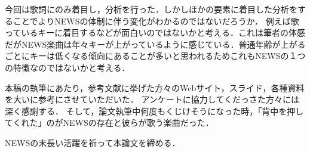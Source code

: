 今回は歌詞にのみ着目し，分析を行った．しかしほかの要素に着目した分析をすることでよりNEWSの体制に伴う変化がわかるのではないだろうか．
例えば歌っているキーに着目するなどが面白いのではないかと考える．これは筆者の体感だがNEWS楽曲は年々キーが上がっているように感じている．普通年齢が上がるごとにキーは低くなる傾向にあることが多いと思われるためこれもNEWSの１つの特徴なのではないかと考える．




\begin{acknowledgment}
	本稿の執筆にあたり，参考文献に挙げた方々のWebサイト，スライド，各種資料を大いに参考にさせていただいた．
	アンケートに協力してくだっさた方々には深く感謝する．
	そして，論文執筆中何度もくじけそうになった時，「背中を押してくれた」のがNEWSの存在と彼らが歌う楽曲だった．

	NEWSの末長い活躍を祈って本論文を締める．
\end{acknowledgment}

